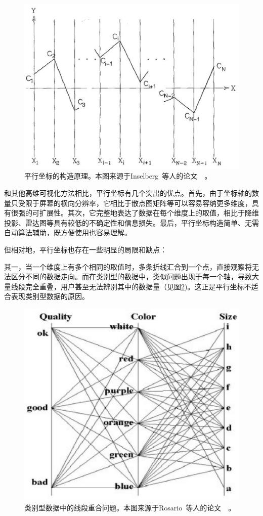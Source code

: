 \documentclass[12pt,twocolumn]{article}
\begin{document}
\begin{figure}[!htb]
\centering
\includegraphics[width=0.9\linewidth]{images/PC_principle.eps}
\caption{\label{fig:PC_principle}平行坐标的构造原理。本图来源于Inselberg~等人的论文~\citep{inselberg1985plane}~。
}
\end{figure}

和其他高维可视化方法相比，平行坐标有几个突出的优点。首先，由于坐标轴的数量只受限于屏幕的横向分辨率，它相比于散点图矩阵等可以容易容纳更多维度，具有很强的可扩展性。其次，它完整地表达了数据在每个维度上的取值，相比于降维投影、雷达图等具有较低的不确定性和信息损失。最后，平行坐标构造简单、无需自动算法辅助，既方便使用也容易理解。

但相对地，平行坐标也存在一些明显的局限和缺点：

其一，当一个维度上有多个相同的取值时，多条折线汇合到一个点，直接观察将无法区分不同的数据走向。而在类别型的数据中，类似问题出现于每一个轴，导致大量线段完全重叠，用户甚至无法辨别其中的数据量（见图\ref{fig:PC_coincide})。这正是平行坐标不适合表现类别型数据的原因。

\begin{figure}[!htb]
\centering
\includegraphics[width=0.6\linewidth]{images/PC_coincide.eps}
\caption{\label{fig:PC_coincide}类别型数据中的线段重合问题。本图来源于Rosario~等人的论文~\citep{rosario2004mapping}~。
}
\end{figure}
\end{document}

